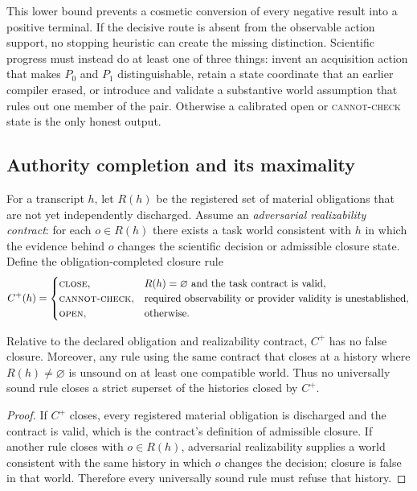 This lower bound prevents a cosmetic conversion of every negative result into a
positive terminal.  If the decisive route is absent from the observable action
support, no stopping heuristic can create the missing distinction.  Scientific
progress must instead do at least one of three things: invent an acquisition
action that makes $P_0$ and $P_1$ distinguishable, retain a state coordinate
that an earlier compiler erased, or introduce and validate a substantive world
assumption that rules out one member of the pair.  Otherwise a calibrated open
or \textsc{cannot-check} state is the only honest output.

\subsection{Authority completion and its maximality}

For a transcript $h$, let $R(h)$ be the registered set of material obligations
that are not yet independently discharged.  Assume an \emph{adversarial
realizability contract}: for each $o\in R(h)$ there exists a task world
consistent with $h$ in which the evidence behind $o$ changes the scientific
decision or admissible closure state.  Define the obligation-completed closure
rule
\[
 C^+(h)=
 \begin{cases}
  \textsc{close}, & R(h)=\varnothing\ \text{and the task contract is valid},\\
  \textsc{cannot-check}, & \text{required observability or provider validity is unestablished},\\
  \textsc{open}, & \text{otherwise}.
 \end{cases}
\]

\begin{theorem}
\label{thm:maximal-completion}
Relative to the declared obligation and realizability contract, $C^+$ has no
false closure.  Moreover, any rule using the same contract that closes at a
history where $R(h)\ne\varnothing$ is unsound on at least one compatible world.
Thus no universally sound rule closes a strict superset of the histories closed
by $C^+$.
\end{theorem}

\begin{proof}
If $C^+$ closes, every registered material obligation is discharged and the
contract is valid, which is the contract's definition of admissible closure.  If
another rule closes with $o\in R(h)$, adversarial realizability supplies a world
consistent with the same history in which $o$ changes the decision; closure is
false in that world.  Therefore every universally sound rule must refuse that
history.
\end{proof}

